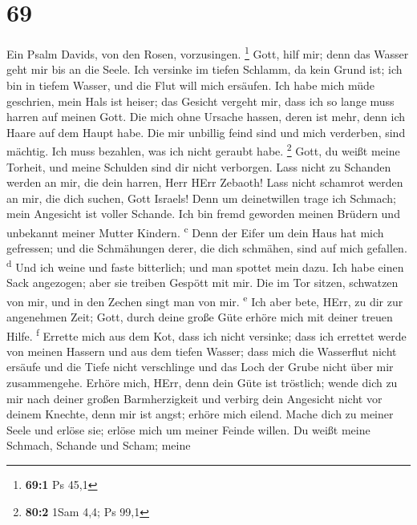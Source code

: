 \hypertarget{section-68}{%
\section{69}\label{section-68}}

 Ein Psalm Davids, von den Rosen, vorzusingen. \footnote{\textbf{69:1}
  Ps 45,1}  Gott, hilf mir; denn das Wasser geht mir bis
an die Seele.  Ich versinke im tiefen Schlamm, da kein
Grund ist; ich bin in tiefem Wasser, und die Flut will mich ersäufen.
 Ich habe mich müde geschrien, mein Hals ist heiser; das
Gesicht vergeht mir, dass ich so lange muss harren auf meinen Gott.
 Die mich ohne Ursache hassen, deren ist mehr, denn ich
Haare auf dem Haupt habe. Die mir unbillig feind sind und mich
verderben, sind mächtig. Ich muss bezahlen, was ich nicht geraubt habe.
\footnote{\textbf{80:2} 1Sam 4,4; Ps 99,1}  Gott, du weißt
meine Torheit, und meine Schulden sind dir nicht verborgen.
 Lass nicht zu Schanden werden an mir, die dein harren,
Herr HErr Zebaoth! Lass nicht schamrot werden an mir, die dich suchen,
Gott Israels!  Denn um deinetwillen trage ich Schmach;
mein Angesicht ist voller Schande.  Ich bin fremd geworden
meinen Brüdern und unbekannt meiner Mutter Kindern. \textsuperscript{c}
 Denn der Eifer um dein Haus hat mich gefressen; und die
Schmähungen derer, die dich schmähen, sind auf mich gefallen.
\textsuperscript{d}  Und ich weine und faste bitterlich;
und man spottet mein dazu.  Ich habe einen Sack
angezogen; aber sie treiben Gespött mit mir.  Die im Tor
sitzen, schwatzen von mir, und in den Zechen singt man von mir.
\textsuperscript{e}  Ich aber bete, HErr, zu dir zur
angenehmen Zeit; Gott, durch deine große Güte erhöre mich mit deiner
treuen Hilfe. \textsuperscript{f}  Errette mich aus dem
Kot, dass ich nicht versinke; dass ich errettet werde von meinen Hassern
und aus dem tiefen Wasser;  dass mich die Wasserflut
nicht ersäufe und die Tiefe nicht verschlinge und das Loch der Grube
nicht über mir zusammengehe.  Erhöre mich, HErr, denn
dein Güte ist tröstlich; wende dich zu mir nach deiner großen
Barmherzigkeit  und verbirg dein Angesicht nicht vor
deinem Knechte, denn mir ist angst; erhöre mich eilend. 
Mache dich zu meiner Seele und erlöse sie; erlöse mich um meiner Feinde
willen.  Du weißt meine Schmach, Schande und Scham; meine

